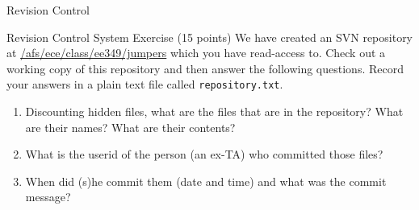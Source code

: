 \documentclass{article}
\begin{document}
\begin{section}{Revision Control}
\begin{subsection}{Revision Control System Exercise (15 points)}
	We have created an SVN repository at
	\url{/afs/ece/class/ee349/jumpers} which you have read-access
	to.  Check out a working copy of this repository and then
	answer the following questions.  Record your answers in a
	plain text file called \texttt{repository.txt}.
	\begin{enumerate} \item Discounting hidden files, what are the
	files that are in the repository?  What are their names?  What
	are their contents?  \item What is the userid of the person
	(an ex-TA) who committed those files?  \item When did (s)he
	commit them (date and time) and what was the commit message?
	\end{enumerate} \end{subsection} \end{section}
\end{document}
